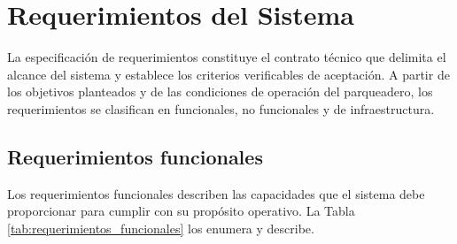 \section{Requerimientos del Sistema}

La especificación de requerimientos constituye el contrato técnico que delimita
el alcance del sistema y establece los criterios verificables de aceptación. A
partir de los objetivos planteados y de las condiciones de operación del
parqueadero, los requerimientos se clasifican en funcionales, no funcionales y
de infraestructura.

\subsection{Requerimientos funcionales}

Los requerimientos funcionales describen las capacidades que el sistema debe
proporcionar para cumplir con su propósito operativo. La Tabla
\ref{tab:requerimientos_funcionales} los enumera y describe.

